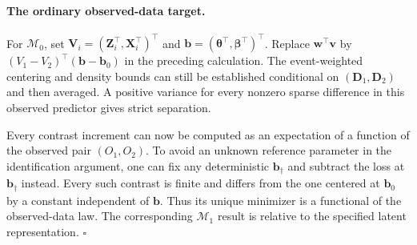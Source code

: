 \paragraph{The ordinary observed-data target.}
For $\mathcal M_0$, set $\bm{V}_i=(\bm{Z}_i^\top,\bm{X}_i^\top)^\top$ and $\bm{b}=(\bm{\theta}^\top,\bm{\beta}^\top)^\top$. Replace $\bm{w}^\top \bm{v}$ by $(V_1-V_2)^\top(\bm{b}-\bm{b}_0)$ in the preceding calculation. The event-weighted centering and density bounds can still be established conditional on $(\bm{D}_1,\bm{D}_2)$ and then averaged. A positive variance for every nonzero sparse difference in this observed predictor gives strict separation.

Every contrast increment can now be computed as an expectation of a function of the observed pair $(O_1,O_2)$. To avoid an unknown reference parameter in the identification argument, one can fix any deterministic $\bm{b}_\dagger$ and subtract the loss at $\bm{b}_\dagger$ instead. Every such contrast is finite and differs from the one centered at $\bm{b}_0$ by a constant independent of $\bm{b}$. Thus its unique minimizer is a functional of the observed-data law. The corresponding $\mathcal M_1$ result is relative to the specified latent representation.
\hfill$\square$
